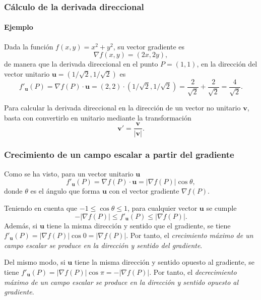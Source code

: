 \begin{frame}
\frametitle{Cálculo de la derivada direccional}
\framesubtitle{Ejemplo}
Dada la función $f(x,y) = x^2+y^2$, su vector gradiente es
\[
\nabla f(x,y) = (2x,2y),
\]
de manera que la derivada direccional en el punto $P=(1,1)$, en la dirección del vector unitario $\mathbf{u}=(1/\sqrt{2},1/\sqrt{2})$ es
\[
f'_{\mathbf{u}}(P) = \nabla f(P)\cdot \mathbf{u} = (2,2)\cdot(1/\sqrt{2},1/\sqrt{2}) = \frac{2}{\sqrt{2}}+\frac{2}{\sqrt{2}} = \frac{4}{\sqrt{2}}.
\]

Para calcular la derivada direccional en la dirección de un vector no unitario $\mathbf{v}$, basta con convertirlo en unitario mediante la transformación
\[
\mathbf{v'}=\frac{\mathbf{v}}{|\mathbf{v}|}.
\] 
\end{frame}


\begin{frame}
\frametitle{Crecimiento de un campo escalar a partir del gradiente}
Como se ha visto, para un vector unitario $\mathbf{u}$
\[
f'_{\mathbf{u}}(P) = \nabla f(P)\cdot \mathbf{u} = |\nabla f(P)|\cos \theta,
\] 
donde $\theta$ es el ángulo que forma $\mathbf{u}$ con el vector gradiente $\nabla f(P)$.

Teniendo en cuenta que $-1\leq \cos\theta\leq 1$, para cualquier vector $\mathbf{u}$ se cumple 
\[
-|\nabla f(P)|\leq f'_{\mathbf{u}}(P)\leq |\nabla f(P)|.
\]
Además, si $\mathbf{u}$ tiene la misma dirección y sentido que el gradiente, se tiene $f'_{\mathbf{u}}(P)=|\nabla f(P)|\cos 0=|\nabla f(P)|$. 
Por tanto, el \alert{\emph{crecimiento máximo de un campo escalar se produce en la dirección y sentido del gradiente}}.

Del mismo modo, si $\mathbf{u}$ tiene la misma dirección y sentido opuesto al gradiente, se tiene $f'_{\mathbf{u}}(P)=|\nabla f(P)|\cos \pi=-|\nabla f(P)|$. 
Por tanto, el \alert{\emph{decrecimiento máximo de un campo escalar se produce en la dirección y sentido opuesto al gradiente}}.  
\end{frame}


